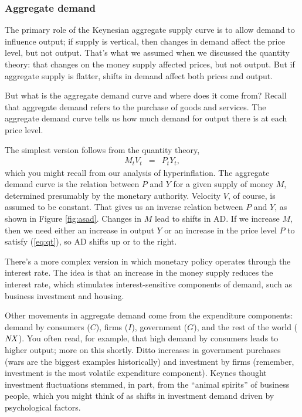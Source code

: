 \documentclass[letterpaper,12pt]{article}
\newcommand{\NX}{\mbox{\em NX\/}}
\begin{document}
\subsubsection*{Aggregate demand}


The primary role of the Keynesian aggregate supply curve is to
allow demand to influence output;
if supply is vertical, then changes in demand affect the price level,
but not output.
That's what we assumed when we discussed the quantity theory:
that changes on the money supply affected prices, but not output.
But if aggregate supply is flatter, 
shifts in demand affect both prices and output. 

But what is the aggregate demand curve and where does it come from?
Recall that aggregate demand refers to the purchase of goods and services.
The aggregate demand curve tells us how much demand for output 
there is at each price level.

The simplest version follows from the quantity theory, 
\begin{eqnarray}
    M_t V_t &=& P_t Y_t ,
    \label{eq:qt} 
\end{eqnarray}
which you might recall from our analysis of hyperinflation.
The aggregate demand curve is the relation between $P$ and $Y$ for a 
given supply of money $M$, 
determined presumably by the monetary authority.
Velocity $V$, of course, is assumed to be constant.  
That gives us an inverse relation between $P$ and $Y$, 
as shown in Figure \ref{fig:asad}.
Changes in $M$ lead to shifts in AD.
If we increase $M$, then we need either an increase in output $Y$
or an increase in the price level $P$ to satisfy (\ref{eq:qt}), 
so AD shifts up or to the right.  

There's a more complex version in which monetary policy operates
through the interest rate. 
The idea is that an increase in the money supply reduces 
the interest rate,  
which stimulates interest-sensitive components of demand,
such as business investment and housing.

Other movements in aggregate demand come from the expenditure components:  
demand by consumers ($C$), firms ($I$), government ($G$),
and the rest of the world ($\NX$).
You often read, for example, that high demand by consumers
leads to higher output; more on this shortly.
Ditto increases in government purchases
(wars are the biggest examples historically)
and investment by firms (remember, investment is the most volatile
expenditure component).
Keynes thought investment fluctuations stemmed,
in part, from the ``animal spirits'' of business people,
which you might think of as shifts in investment demand
driven by psychological factors.
\end{document}

